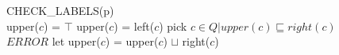 \begin{algorithm}[h]
\SetAlgoNoEnd
CHECK\_LABELS(p)\\
{
  {
    upper($c$) = $\top$
  }
  \Else
  {
    upper($c$) = left($c$)
  }
}
{
  pick $c \in Q | upper(c) \sqsubseteq right(c)$\\
  {
    $ERROR$
  }
  let upper($c$) = upper($c$) $\sqcup$ right($c$)
}
\end{algorithm}

